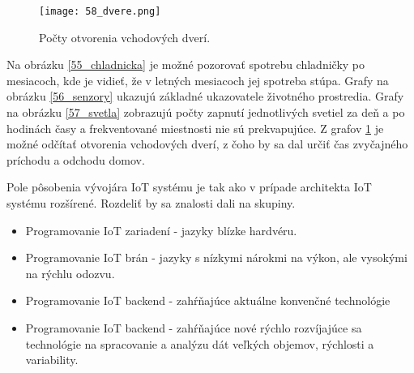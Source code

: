 \begin{figure}[!htbp]
\centering
\texttt{[image: 58\_dvere.png]}
\caption{Počty otvorenia vchodových dverí.}
\label{58_dvere}
\end{figure}
Na obrázku \ref{55_chladnicka} je možné pozorovať spotrebu chladničky po mesiacoch, kde je vidieť, že v letných mesiacoch jej spotreba stúpa. Grafy na obrázku \ref{56_senzory} ukazujú základné ukazovatele životného prostredia. Grafy na obrázku \ref{57_svetla} zobrazujú počty zapnutí jednotlivých svetiel za deň a po hodinách časy a frekventované miestnosti nie sú prekvapujúce. Z grafov \ref{58_dvere} je možné odčítať otvorenia vchodových dverí, z čoho by sa dal určiť čas zvyčajného príchodu a odchodu domov.

Pole pôsobenia vývojára IoT systému je tak ako v prípade architekta IoT systému rozšírené. Rozdeliť by sa znalosti dali na skupiny.
\begin{itemize}
\item Programovanie IoT zariadení - jazyky blízke hardvéru.
\item Programovanie IoT brán - jazyky s nízkymi nárokmi na výkon, ale vysokými na rýchlu odozvu.
\item Programovanie IoT backend - zahŕňajúce aktuálne konvenčné technológie
\item Programovanie IoT backend - zahŕňajúce nové rýchlo rozvíjajúce sa technológie na spracovanie a analýzu dát veľkých objemov, rýchlosti a variability.
\end{itemize}

